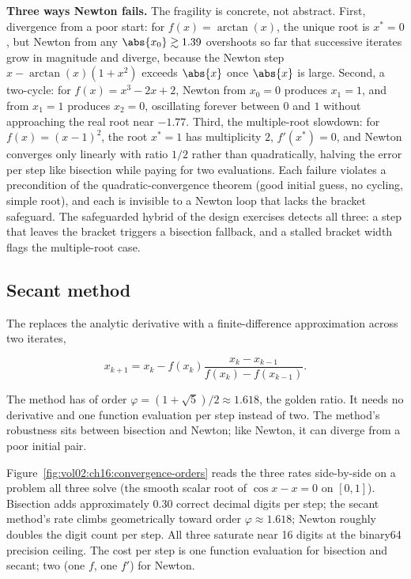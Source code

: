 \begin{example}
\textbf{Three ways Newton fails.} The fragility is concrete, not
abstract. First, divergence from a poor start: for $f(x) =
\arctan(x)$, the unique root is $x^{*} = 0$, but Newton from any
$\abs{x_{0}} \gtrsim 1.39$ overshoots so far that successive iterates
grow in magnitude and diverge, because the Newton step $x -
\arctan(x)(1 + x^{2})$ exceeds $\abs{x}$ once $\abs{x}$ is large.
Second, a two-cycle: for $f(x) = x^{3} - 2x + 2$, Newton from
$x_{0} = 0$ produces $x_{1} = 1$, and from $x_{1} = 1$ produces
$x_{2} = 0$, oscillating forever between $0$ and $1$ without
approaching the real root near $-1.77$. Third, the multiple-root
slowdown: for $f(x) = (x - 1)^{2}$, the root $x^{*} = 1$ has
multiplicity $2$, $f'(x^{*}) = 0$, and Newton converges only
linearly with ratio $1/2$ rather than quadratically, halving the
error per step like bisection while paying for two evaluations. Each
failure violates a precondition of the quadratic-convergence theorem
(good initial guess, no cycling, simple root), and each is invisible
to a Newton loop that lacks the bracket safeguard. The safeguarded
hybrid of the design exercises detects all three: a step that leaves
the bracket triggers a bisection fallback, and a stalled bracket
width flags the multiple-root case.
\end{example}

\subsection{Secant method}

The  replaces the analytic derivative
with a finite-difference approximation across two iterates,

\[
x_{k+1} = x_{k} - f(x_{k}) \frac{x_{k} - x_{k-1}}
{f(x_{k}) - f(x_{k-1})}.
\]

The method has  of order
$\varphi = (1 + \sqrt{5})/2 \approx 1.618$, the golden ratio. It
needs no derivative and one function evaluation per step instead
of two. The method's robustness sits between bisection and
Newton; like Newton, it can diverge from a poor initial pair.



Figure~\ref{fig:vol02:ch16:convergence-orders} reads the three rates
side-by-side on a problem all three solve (the smooth scalar root of
$\cos x - x = 0$ on $[0, 1]$). Bisection adds approximately $0.30$
correct decimal digits per step; the secant method's rate climbs
geometrically toward order $\varphi \approx 1.618$; Newton roughly
doubles the digit count per step. All three saturate near 16 digits
at the binary64 precision ceiling. The cost per step is one function
evaluation for bisection and secant; two (one $f$, one $f'$) for
Newton.


